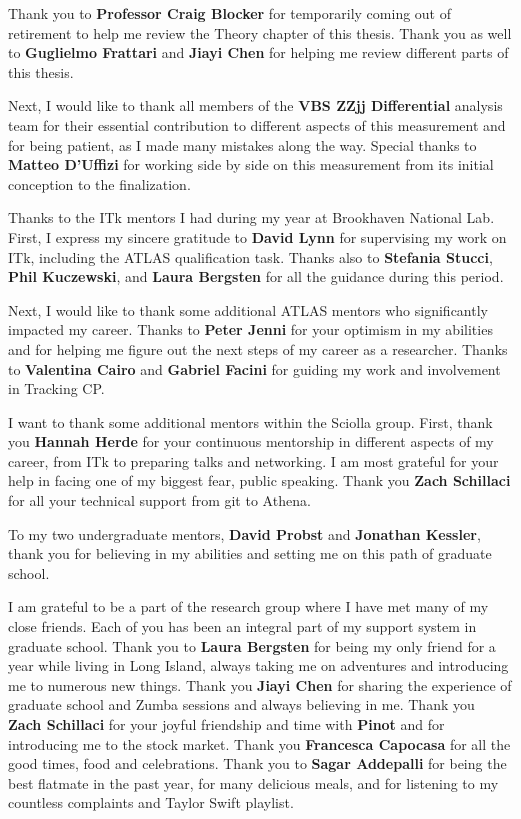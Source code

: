 \documentclass[red]{brandeis-dissertation}
\numberwithin{equation}{section}
\begin{document}
{Thank you to \textbf{Professor Craig Blocker} for temporarily coming out of retirement to help me review the Theory chapter of this thesis. Thank you as well to \textbf{Guglielmo Frattari} and \textbf{Jiayi Chen} for helping me review different parts of this thesis. 

Next, I would like to thank all members of the \textbf{VBS ZZjj Differential} analysis team for their essential contribution to different aspects of this measurement and for being patient, as I made many mistakes along the way. Special thanks to \textbf{Matteo D'Uffizi} for working side by side on this measurement from its initial conception to the finalization.

Thanks to the ITk mentors I had during my year at Brookhaven National Lab. First, I express my sincere gratitude to \textbf{David Lynn} for supervising my work on ITk, including the ATLAS qualification task. Thanks also to \textbf{Stefania Stucci}, \textbf{Phil Kuczewski}, and \textbf{Laura Bergsten} for all the guidance during this period. 

Next, I would like to thank some additional ATLAS mentors who significantly impacted my career. Thanks to \textbf{Peter Jenni} for your optimism in my abilities and for helping me figure out the next steps of my career as a researcher. Thanks to \textbf{Valentina Cairo} and \textbf{Gabriel Facini} for guiding my work and involvement in Tracking CP. 

I want to thank some additional mentors within the Sciolla group. First, thank you \textbf{Hannah Herde} for your continuous mentorship in different aspects of my career, from ITk to preparing talks and networking. I am most grateful for your help in facing one of my biggest fear, public speaking. Thank you \textbf{Zach Schillaci} for all your technical support from git to Athena.

To my two undergraduate mentors, \textbf{David Probst} and \textbf{Jonathan Kessler}, thank you for believing in my abilities and setting me on this path of graduate school. 

I am grateful to be a part of the research group where I have met many of my close friends. Each of you has been an integral part of my support system in graduate school. Thank you to \textbf{Laura Bergsten} for being my only friend for a year while living in Long Island, always taking me on adventures and introducing me to numerous new things. Thank you \textbf{Jiayi Chen} for sharing the experience of graduate school and Zumba sessions and always believing in me. Thank you \textbf{Zach Schillaci} for your joyful friendship and time with \textbf{Pinot} and for introducing me to the stock market. Thank you \textbf{Francesca Capocasa} for all the good times, food and celebrations. Thank you to \textbf{Sagar Addepalli} for being the best flatmate in the past year, for many delicious meals, and for listening to my countless complaints and Taylor Swift playlist. 

}
\end{document}
